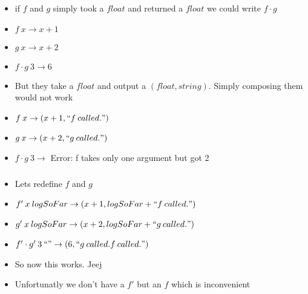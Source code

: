 \begin{frame}[fragile]
    \frametitle{}
    \begin{block}{}
        \begin{itemize}
            \item if $f$ and $g$ simply took a $float$ and returned a $float$ we could write $f \cdot g$
            \item $f \: x \rightarrow x+1$
            \item $g \: x \rightarrow x+2$
            \item $f \cdot g \: 3 \rightarrow 6$
        \end{itemize}
    \end{block}
    \begin{block}{}
        \begin{itemize}
            \item But they take a $float$ and output a $(float, string)$. Simply composing them would not work
            \item $f \: x \rightarrow (x+1, ``f \: called.")$
            \item $g \: x \rightarrow (x+2, ``g \: called.")$
            \item $f \cdot g \: 3 \rightarrow$ Error: f takes only one argument but got 2
        \end{itemize}
    \end{block}
\end{frame}

\begin{frame}[fragile]
    \frametitle{}
    \begin{block}{}
        \begin{itemize}
            \item Lets redefine $f$ and $g$
            \item $f' \: x \: logSoFar \rightarrow (x+1, logSoFar + ``f \: called.")$
            \item $g' \: x \: logSoFar \rightarrow (x+2, logSoFar + ``g \: called.")$
            \item $f' \cdot g' \: 3 \: ``" \rightarrow (6, ``g \: called.f \: called.")$
            \item So now this works. Jeej
            \item Unfortunatly we don't have a $f'$ but an $f$ which is inconvenient
        \end{itemize}
    \end{block}
\end{frame}

